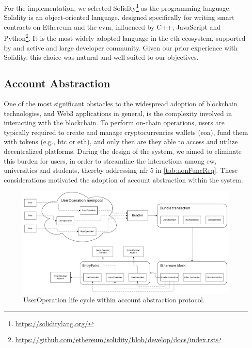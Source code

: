 For the implementation, we selected Solidity\footnote{\url{https://soliditylang.org/}} as the programming language. Solidity is an object-oriented language, designed specifically for writing smart contracts on Ethereum and the \gls{evm}, influenced by C++, JavaScript and Python\footnote{\url{https://github.com/ethereum/solidity/blob/develop/docs/index.rst}}. It is the most widely adopted language in the \gls{eth} ecosystem, supported by and active and large developer community. Given our prior experience with Solidity, this choice was natural and well-suited to our objectives.

\subsection{Account Abstraction}
\label{ssec:accountAbstraction}
One of the most significant obstacles to the widespread adoption of blockchain technologies, and Web3 applications in general, is the complexity involved in interacting with the blockchain. To perform on-chain operations, users are typically required to create and manage cryptocurrencies wallets (\gls{eoa}), fund them with tokens (e.g., \gls{btc} or \gls{eth}), and only then are they able to access and utilize decentralized platforms. During the design of the system, we aimed to eliminate this burden for users, in order to streamline the interactions among \gls{ew}, universities and students, thereby addressing \gls{nfr} 5 in \cref{tab:nonFuncReq}. These considerations motivated the adoption of account abstraction within the system.

\begin{figure}
  \centering
  \includegraphics[width=1\textwidth]{figures/Account Abstraction.pdf}
  \caption[UserOperation life cycle within account abstraction protocol]{UserOperation life cycle within account abstraction protocol.}
  \label{fig:accountAbstraction}
\end{figure}

